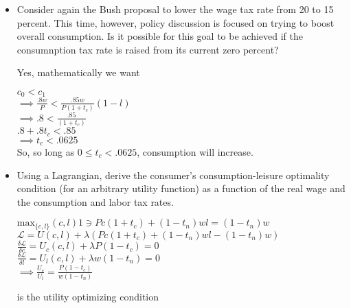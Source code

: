 \documentclass[11pt]{SelfArxOneColBMN}
\begin{document}
\begin{exercise}
\begin{itemize}
\item Consider again the Bush proposal to lower the wage tax rate from 20 to 15 percent. This time, however, policy discussion is focused on trying to boost overall consumption. Is it possible for this goal to be achieved if the consumnption tax rate is raised from its current zero percent?

        \begin{solution}
                Yes, mathematically we want\\
		\begin{center}
			$c_0 < c_1$\\
			$\implies \frac{.8w}{P} < \frac{.85w}{P(1 + t_c)}(1 - l)$\\
			$\implies .8 < \frac{.85}{(1 + t_c)}$\\
			$.8 + .8t_c < .85$\\
			$\implies t_c < .0625$\\
			So, so long as $0 \leq t_c < .0625$, consumption will increase.
		\end{center}
	\end{solution}


\item Using a Lagrangian, derive the consumer's consumption-leisure optimality condition (for an arbitrary utility function) as a function of the real wage and the consumption and labor tax rates.

        \begin{solution}
		\begin{center}
			$\text{max}_{\{c,l\}}(c,l)1 \ni Pc(1 + t_c) + (1 - t_n)wl = (1 - t_n)w$\\
			$\mathcal{L} = U(c,l) + \lambda(Pc(1 + t_c) + (1 - t_n)wl - (1 - t_n)w)$\\
			$\frac{\delta \mathcal{L}}{\delta c} = U_c(c, l) + \lambda P(1 - t_c) = 0$\\
			$\frac{\delta \mathcal{L}}{\delta l} = U_l(c, l) + \lambda w(1 - t_n) = 0$\\
			$\implies \frac{U_c}{U_l} = \frac{P(1 - t_c)}{w(1 - t_n)}$
		\end{center}
		is the utility optimizing condition
        \end{solution}
\end{itemize}
\end{exercise}
\end{document}
